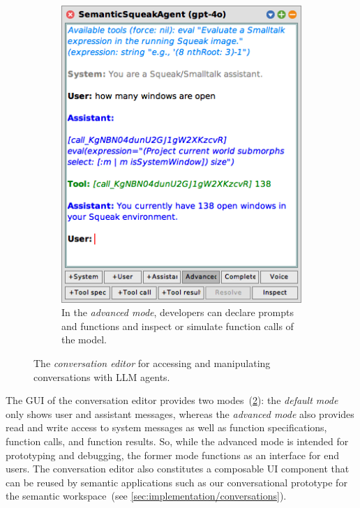 \begin{figure}[t]
\begin{subfigure}[t]{0.5\dimexpr\textwidth-1em\relax}
        \includegraphics[width=\textwidth]{03_tools/editor/advanced.png}
        \caption{In the \emph{advanced mode}, developers can declare prompts and functions and inspect or simulate function calls of the model.}
        \label{fig:semtex/tools/editor/advanced}
    \end{subfigure}
	\caption[The \emph{conversation editor} for accessing and manipulating conversations with LLM agents.]{
		The \emph{conversation editor} for accessing and manipulating conversations with LLM agents.
	}
	\label{fig:semtex/tools/editor}
\end{figure}

The GUI of the conversation editor provides two modes~(\cref{fig:semtex/tools/editor}):
the \emph{default mode} only shows user and assistant messages, whereas the \emph{advanced mode} also provides read and write access to system messages as well as function specifications, function calls, and function results.
So, while the advanced mode is intended for prototyping and debugging, the former mode functions as an interface for end users.
The conversation editor also constitutes a composable UI component that can be reused by semantic applications such as our conversational prototype for the semantic workspace~(see \cref{sec:implementation/conversations}).

